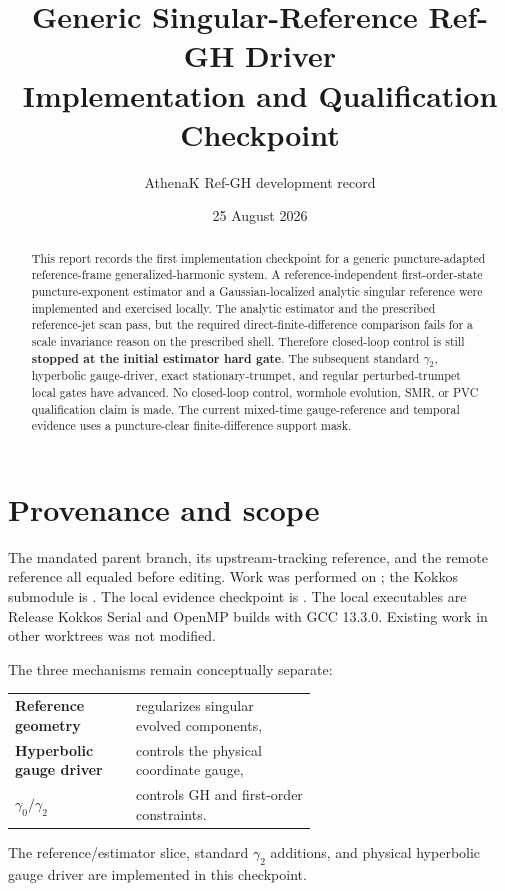 \documentclass[11pt]{article}
\title{Generic Singular-Reference Ref-GH Driver\\
Implementation and Qualification Checkpoint}
\author{AthenaK Ref-GH development record}
\date{25 August 2026}
\newcommand{\status}[1]{\textcolor{red!70!black}{\textbf{#1}}}
\begin{document}
\maketitle

\begin{abstract}
This report records the first implementation checkpoint for a generic
puncture-adapted reference-frame generalized-harmonic system.  A
reference-independent first-order-state puncture-exponent estimator and a
Gaussian-localized analytic singular reference were implemented and exercised
locally.  The analytic estimator and the prescribed reference-jet scan pass,
but the required direct-finite-difference comparison fails for a scale
invariance reason on the prescribed shell.  Therefore closed-loop control is
still \status{stopped at the initial estimator hard gate}. The subsequent
standard $\gamma_2$, hyperbolic gauge-driver, exact stationary-trumpet, and
regular perturbed-trumpet local gates have advanced. No closed-loop control,
wormhole evolution, SMR, or PVC qualification claim is made.  The current
mixed-time gauge-reference and temporal evidence uses a puncture-clear
finite-difference support mask.
\end{abstract}

\section{Provenance and scope}

The mandated parent branch, its upstream-tracking reference, and the remote
reference all equaled
 before editing.  Work was
performed on ; the Kokkos
submodule is .  The local
evidence checkpoint is
.  The local executables are
Release Kokkos Serial and OpenMP builds with GCC 13.3.0. Existing work in other
worktrees was not modified.

The three mechanisms remain conceptually separate:
\begin{center}
\begin{tabular}{>{\bfseries}l p{0.60\linewidth}}
Reference geometry & regularizes singular evolved components,\\
Hyperbolic gauge driver & controls the physical coordinate gauge,\\
$\gamma_0/\gamma_2$ & controls GH and first-order constraints.
\end{tabular}
\end{center}
The reference/estimator slice, standard $\gamma_2$ additions, and physical
hyperbolic gauge driver are implemented in this checkpoint.
\end{document}

